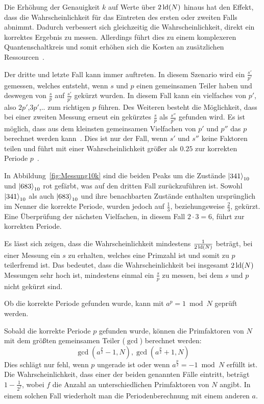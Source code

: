 Die Erhöhung der Genauigkeit \(k\) auf Werte über \(2\operatorname{ld}(N)\) hinaus hat den Effekt, 
dass die Wahrscheinlichkeit für das Eintreten des ersten oder zweiten Falls abnimmt.
Dadurch verbessert sich gleichzeitig die Wahrscheinlichkeit, direkt ein korrektes Ergebnis zu messen.
Allerdings führt dies zu einem komplexeren Quantenschaltkreis und 
somit erhöhen sich die Kosten an zusätzlichen Ressourcen~\autocite[229]{nielsen_chuang_2010}.

Der dritte und letzte Fall kann immer auftreten.
In diesem Szenario wird ein \(\frac{s'}{p'}\) gemessen, 
welches entsteht, wenn \(s\) und \(p\) einen gemeinsamen Teiler haben und 
deswegen von \(\frac{s}{p}\) auf \(\frac{s'}{p'}\) gekürzt wurden.
In diesem Fall kann ein vielfaches von \(p'\), also \(2p'\),\(3p'\),.. zum richtigen \(p\) führen.
Des Weiteren besteht die Möglichkeit, 
dass bei einer zweiten Messung erneut ein gekürztes \(\frac{s}{p}\) als \(\frac{s''}{p''}\) gefunden wird.
Es ist möglich, dass aus dem kleinsten gemeinsamen Vielfachen von \(p'\) und \(p''\) das \(p\) berechnet werden kann~\cite{Shor_1997}.
Dies ist nur der Fall, wenn \(s'\) und \(s''\) keine Faktoren teilen und 
führt mit einer Wahrscheinlichkeit größer als \(0.25\) zur korrekten Periode \(p\)~\autocite[231]{nielsen_chuang_2010}.

In Abbildung~\ref{fig:Messung10k} sind die beiden Peaks um die Zustände \(\ket{341}_{10}\) und \(\ket{683}_{10}\) rot gefärbt, 
was auf den dritten Fall zurückzuführen ist.
Sowohl \(\ket{341}_{10}\) als auch \(\ket{683}_{10}\) und ihre benachbarten Zustände 
enthalten ursprünglich im Nenner die korrekte Periode, 
wurden jedoch  auf \(\frac{1}{3}\), beziehungsweise \(\frac{2}{3}\), gekürzt. 
Eine Überprüfung der nächsten Vielfachen, in diesem Fall \(2 \cdot 3 = 6 \), führt zur korrekten Periode.

Es lässt sich zeigen, dass die Wahrscheinlichkeit mindestens \(\frac{1}{2\operatorname{ld}(N)}\) beträgt, 
bei einer Messung ein \(s\) zu erhalten, welches eine Primzahl ist und somit zu \(p\) teilerfremd ist.
Das bedeutet, dass die Wahrscheinlichkeit bei insgesamt \(2\operatorname{ld}(N)\) Messungen sehr hoch ist, 
mindestens einmal ein \(\frac{s}{p}\) zu messen, 
bei dem \(s\) und \(p\) nicht gekürzt sind.~\cite[231]{nielsen_chuang_2010}

Ob die korrekte Periode gefunden wurde, kann mit \(a^p = 1 \bmod N\) geprüft werden.

Sobald die korrekte Periode \(p\) gefunden wurde, 
können die Primfaktoren von \(N\) mit dem größten gemeinsamen Teiler (\(\gcd\)) berechnet werden:
\[\gcd(a^{\frac{p}{2}}-1, N), \gcd(a^{\frac{p}{2}}+1, N)\]
Dies schlägt nur fehl, 
wenn \(p\) ungerade ist
oder wenn \(a^{\frac{p}{2}} = -1 \bmod N\) erfüllt ist.
Die Wahrscheinlichkeit, dass einer der beiden genannten Fälle eintritt, beträgt \(1-\frac{1}{2^f}\), 
wobei \(f\) die Anzahl an unterschiedlichen Primfaktoren von \(N\) angibt.
In einem solchen Fall wiederholt man die Periodenberechnung mit einem anderen \(a\).~\cite{Shor_1997}

